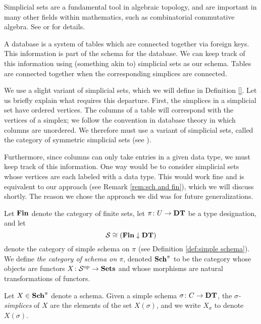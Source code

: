 \documentclass{amsart}
\def\DT{{\bf DT}}
\def\Sch{{\bf Sch}}
\def\Fin{{\bf Fin}}
\begin{document}
Simplicial sets are a fundamental tool in algebraic topology, and are important in many other fields within mathematics, such as combinatorial commutative algebra.   See \cite{Fri} or \cite{GJ} for details.

A database is a system of tables which are connected together via foreign keys.  This information is part of the schema for the database.  We can keep track of this information using (something akin to) simplicial sets as our schema.  Tables are connected together when the corresponding simplices are connected.  

We use a slight variant of simplicial sets, which we will define in Definition \ref{}.  Let us briefly explain what requires this departure.  First, the simplices in a simplicial set have ordered vertices.  The columns of a table will correspond with the vertices of a simplex; we follow the convention in database theory in which columns are unordered.  We therefore must use a variant of simplicial sets, called the category of symmetric simplicial sets (see \cite{Gra}).

Furthermore, since columns can only take entries in a given data type, we must keep track of this information.  One way would be to consider simplicial sets whose vertices are each labeled with a data type.  This would work fine and is equivalent to our approach (see Remark \ref{rem:sch and fin}), which we will discuss shortly.  The reason we chose the approach we did was for future generalizations.

\begin{definition}\label{def:schema}

Let $\Fin$ denote the category of finite sets, let $\pi\taking U\to\DT$ be a type designation, and let $$\mcS\iso(\Fin\down\DT)$$ denote the category of simple schema on $\pi$ (see Definition \ref{def:simple schema}).  We define {\em the category of schema on $\pi$}, denoted $\Sch^\pi$ to be the category whose objects are functors $X\colon\mathcal{S}^\textnormal{op}\rightarrow{\bf Sets}$ and whose morphisms are natural transformations of functors.

Let $X\in\Sch^\pi$ denote a schema.  Given a simple schema $\sigma\taking C\to\DT$, the {\em $\sigma$-simplices} of $X$ are the elements of the set $X(\sigma)$, and we write $X_\sigma$ to denote $X(\sigma)$.

\end{definition}
\end{document}
